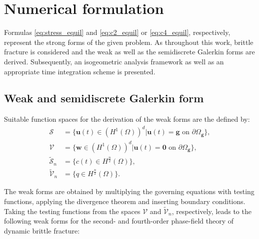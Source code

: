 \section{Numerical formulation} \label{sec:num_formul}
Formulas \eqref{eq:stress_equil} and \eqref{eq:c2_equil} or \eqref{eq:c4_equil}, respectively, represent the strong forms of the given problem. As throughout this work, brittle fracture is considered and the weak as well as the semidiscrete Galerkin forms are derived. Subsequently, an isogeometric analysis framework as well as an appropriate time integration scheme is presented.

\subsection{Weak and semidiscrete Galerkin form} \label{sec:weak_Gal_form}
Suitable function spaces for the derivation of the weak forms are the defined by:
\begin{equation} \label{eq:fct_spaces}
	\begin{aligned}
		\bm{\mathcal{S}} &= \{\mathbf{u}\left(t\right)\in\left(H^{1}\left(\Omega\right)\right)^{d}|\mathbf{u}\left(t\right)=\mathbf{g} \text{ on }\partial\Omega_{\mathbf{g}}\}, \\
		\bm{\mathcal{V}} &= \{\mathbf{w}\in\left(H^{1}\left(\Omega\right)\right)^{d}|\mathbf{u}\left(t\right)=\mathbf{0} \text{ on }\partial\Omega_{\mathbf{g}}\}, \\		
		\tilde{\mathcal{S}}_{n} &= \{c\left(t\right)\in H^{\frac{n}{2}}\left(\Omega\right)\}, \\
		\tilde{\mathcal{V}}_{n} &= \{q\in H^{\frac{n}{2}}\left(\Omega\right)\}.
	\end{aligned}
\end{equation}

The weak forms are obtained by multiplying the governing equations with testing functions, applying the divergence theorem and inserting boundary conditions. Taking the testing functions from the spaces $\mathbf{\mathcal{V}}$ and $\tilde{\mathcal{V}}_{n}$, respectively, leads to the following weak forms for the second- and fourth-order phase-field theory of dynamic brittle fracture:

